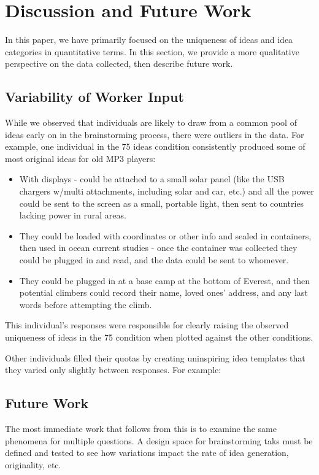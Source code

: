 \section{Discussion and Future Work}

In this paper, we have primarily focused on the uniqueness of ideas and idea categories in quantitative terms. In this section, we provide a more qualitative perspective on the data collected, then describe future work.

\subsection{Variability of Worker Input}
While we observed that individuals are likely to draw from a common pool of ideas early on in the brainstorming process, there were outliers in the data. For example, one individual in the 75 ideas condition consistently produced some of most original ideas for old MP3 players:

\begin{itemize}
\item With displays - could be attached to a small solar panel (like the USB chargers w/multi attachments, including solar and car, etc.) and all the power could be sent to the screen as a small, portable light, then sent to countries lacking power in rural areas.
\item They could be loaded with coordinates or other info and sealed in containers, then used in ocean current studies - once the container was collected they could be plugged in and read, and the data could be sent to whomever.
\item They could be plugged in at a base camp at the bottom of Everest, and then potential climbers could record their name, loved ones' address, and any last words before attempting the climb. 
\end{itemize}

This individual's responses were responsible for clearly raising the observed uniqueness of ideas in the 75 condition when plotted against the other conditions.

Other individuals filled their quotas by creating uninspiring idea templates that they varied only slightly between responses. For example:

\begin{itemize}
\end{itemize}

\subsection{Future Work}
The most immediate work that follows from this is to examine the same phenomena for multiple questions. A design space for brainstorming taks must be defined and tested to see how variations impact the rate of idea generation, originality, etc.

